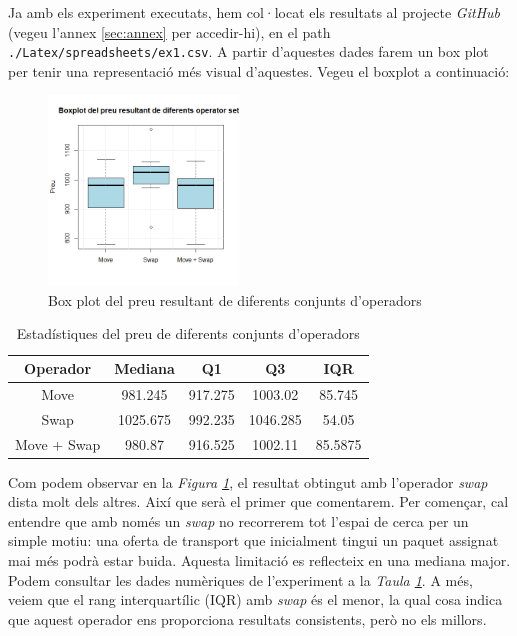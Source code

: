 \documentclass[a4paper]{article}
\begin{document}
	Ja amb els experiment executats, hem col·locat els resultats al projecte \textit{GitHub} (vegeu l'annex \ref{sec:annex} per accedir-hi), en el path \texttt{./Latex/spreadsheets/ex1.csv}. A partir d'aquestes dades farem un box plot per tenir una representació més visual d'aquestes. Vegeu el boxplot a continuació:
	
	\begin{figure}[H]
		\centering
		\includegraphics[width=0.45\textwidth]{images/exp1_boxplot.png}
		\caption{Box plot del preu resultant de diferents conjunts d'operadors}
		\label{fig:exp1_boxplot}
	\end{figure}
	
	\begin{table}[H]
		\centering
		\begin{tabular}{|c|c|c|c|c|}
			\hline
			\textbf{Operador} & \textbf{Mediana} & \textbf{Q1} & \textbf{Q3} & \textbf{IQR} \\
			\hline
			Move & 981.245 & 917.275 & 1003.02 & 85.745 \\
			\hline
			Swap & 1025.675 & 992.235 & 1046.285 & 54.05 \\
			\hline
			Move + Swap & 980.87 & 916.525 & 1002.11 & 85.5875\\
			\hline
		\end{tabular}
		\caption{Estadístiques del preu de diferents conjunts d'operadors}
		\label{tab:exp1_estadisticas}
	\end{table}
	
	Com podem observar en la \textit{Figura \ref{fig:exp1_boxplot}}, el resultat obtingut amb l'operador \textit{swap} dista molt dels altres. Així que serà el primer que comentarem. Per començar, cal entendre que amb només un \textit{swap} no recorrerem tot l'espai de cerca per un simple motiu: una oferta de transport que inicialment tingui un paquet assignat mai més podrà estar buida. Aquesta limitació es reflecteix en una mediana major. Podem consultar les dades numèriques de l'experiment a la \textit{Taula \ref{tab:exp1_estadisticas}}. A més, veiem que el rang interquartílic (IQR) amb \textit{swap} és el menor, la qual cosa indica que aquest operador ens proporciona resultats consistents, però no els millors. \\
	
\end{document}
